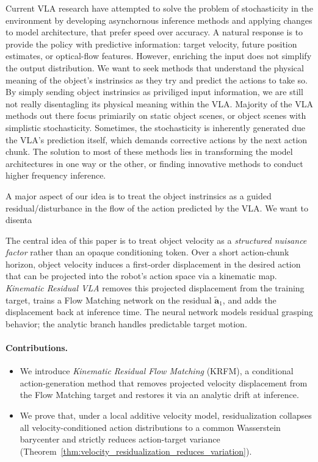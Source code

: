 \documentclass[10pt,twocolumn,letterpaper]{article}
\begin{document}
Current VLA research have attempted to solve the problem of stochasticity in the environment by developing asynchornous inference methods and applying changes to model architecture, that prefer speed over accuracy. A natural response is to provide the policy with predictive information: target velocity, future position estimates, or optical-flow features. However, enriching the input does not simplify the output distribution. We want to seek methods that understand the physical meaning of the object's instrinsics as they try and predict the actions to take so. By simply sending object instrinsics as priviliged input information, we are still not really disentagling its physical meaning within the VLA. 
Majority of the VLA methods out there focus primiarily on static object scenes, or object scenes with simplistic stochasticity. Sometimes, the stochasticity is inherently generated due the VLA's prediction itself, which demands corrective actions by the next action chunk. The solution to most of these methods lies in transforming the model architectures in one way or the other, or finding innovative methods to conduct higher frequency inference.  

A major aspect of our idea is to treat the object instrinsics as a guided residual/disturbance in the flow of the action predicted by the VLA. We want to disenta

The central idea of this paper is to treat object velocity as a \emph{structured nuisance factor} rather than an opaque conditioning token. Over a short action-chunk horizon, object velocity induces a first-order displacement in the desired action that can be projected into the robot's action space via a kinematic map. \emph{Kinematic Residual VLA} removes this projected displacement from the training target, trains a Flow Matching network on the residual $\widetilde{\mathbf a}_1$, and adds the displacement back at inference time. The neural network models residual grasping behavior; the analytic branch handles predictable target motion.

\paragraph{Contributions.}
\begin{itemize}
    \item We introduce \emph{Kinematic Residual Flow Matching} (KRFM), a conditional action-generation method that removes projected velocity displacement from the Flow Matching target and restores it via an analytic drift at inference.
    \item We prove that, under a local additive velocity model, residualization collapses all velocity-conditioned action distributions to a common Wasserstein barycenter and strictly reduces action-target variance (Theorem~\ref{thm:velocity_residualization_reduces_variation}).

\end{itemize}
\end{document}
